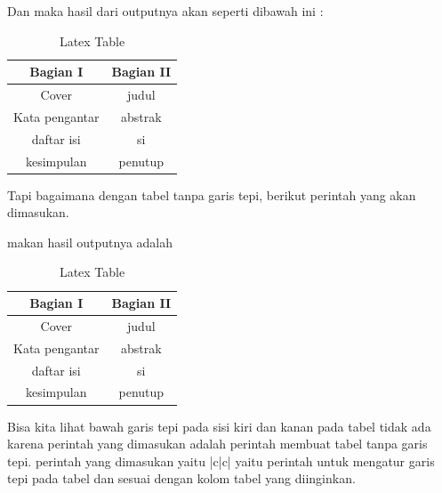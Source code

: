 Dan maka hasil dari outputnya akan seperti dibawah ini :

\begin{table}[h]
\caption{Latex Table}
\centering
\begin{tabular}{|c|c|}
\hline
\textbf{Bagian I}&\textbf{Bagian II}\\
\hline
Cover&judul\\
\hline
Kata pengantar&abstrak\\
\hline
daftar isi&si\\
\hline
kesimpulan&penutup\\
\hline
\end{tabular}
\label{table:permisalan}
\end{table}

Tapi bagaimana dengan tabel tanpa garis tepi, berikut perintah yang akan dimasukan.

 makan hasil outputnya adalah 

\begin{table}[h]
\caption{Latex Table}
\centering
\begin{tabular}{c|c}
\hline
\textbf{Bagian I}&\textbf{Bagian II}\\
\hline
Cover&judul\\
\hline
Kata pengantar&abstrak\\
\hline
daftar isi&si\\
\hline
kesimpulan&penutup\\
\hline
\end{tabular}
\label{table:permisalan}
\end{table}

Bisa kita lihat bawah garis tepi pada sisi kiri dan kanan pada tabel tidak ada karena perintah yang dimasukan adalah perintah membuat tabel tanpa garis tepi. perintah yang dimasukan yaitu |c|c| yaitu perintah untuk mengatur garis tepi pada tabel dan sesuai dengan kolom tabel yang diinginkan.